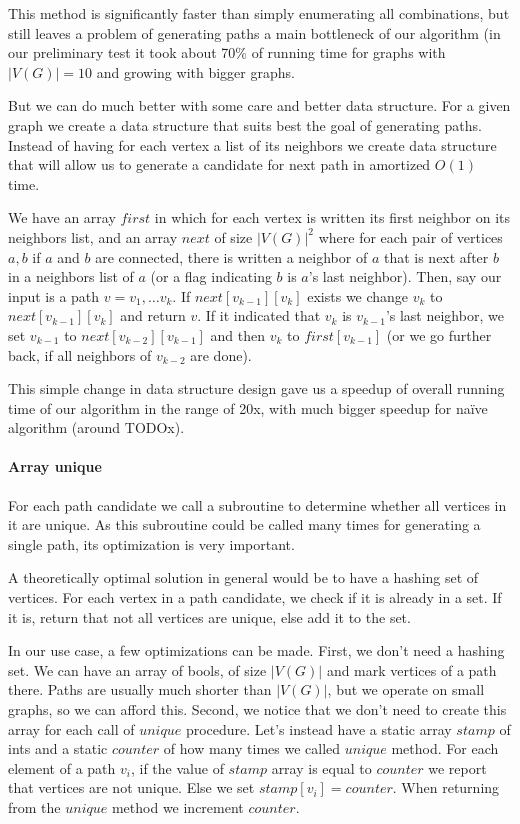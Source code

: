 This method is significantly faster than simply enumerating all combinations, but still leaves a problem of generating paths a main bottleneck of our algorithm (in our preliminary test it took about 70\% of running time for graphs with $|V(G)| = 10$ and growing with bigger graphs. 

But we can do much better with some care and better data structure. For a given graph we create a data structure that suits best the goal of generating paths. Instead of having for each vertex a list of its neighbors we create data structure that will allow us to generate a candidate for next path in amortized $O(1)$ time.

We have an array $first$ in which for each vertex is written its first neighbor on its neighbors list, and an array $next$ of size $|V(G)|^2$ where for each pair of vertices $a, b$ if $a$ and $b$ are connected, there is written a neighbor of $a$ that is next after $b$ in a neighbors list of $a$ (or a flag indicating $b$ is $a$'s last neighbor). Then, say our input is a path $v = v_1, \ldots v_k$. If $next[v_{k-1}][v_k]$ exists we change $v_k$ to $next[v_{k-1}][v_k]$ and return $v$. If it indicated that $v_k$ is $v_{k-1}$'s last neighbor, we set $v_{k-1}$ to $next[v_{k-2}][v_{k-1}]$ and then $v_k$ to $first[v_{k-1}]$ (or we go further back, if all neighbors of $v_{k-2}$ are done).

This simple change in data structure design gave us a speedup of overall running time of our algorithm in the range of 20x, with much bigger speedup for na\"ive algorithm (around TODOx).

\paragraph{Array unique}

For each path candidate we call a subroutine to determine whether all vertices in it are unique. As this subroutine could be called many times for generating a single path, its optimization is very important.

A theoretically optimal solution in general would be to have a hashing set of vertices. For each vertex in a path candidate, we check if it is already in a set. If it is, return that not all vertices are unique, else add it to the set.

In our use case, a few optimizations can be made. First, we don't need a hashing set. We can have an array of bools, of size $|V(G)|$ and mark vertices of a path there. Paths are usually much shorter than $|V(G)|$, but we operate on small graphs, so we can afford this. Second, we notice that we don't need to create this array for each call of $unique$ procedure. Let's instead have a static array $stamp$ of ints and a static $counter$ of how many times we called $unique$ method. For each element of a path $v_i$, if the value of $stamp$ array is equal to $counter$ we report that vertices are not unique. Else we set $stamp[v_i] = counter$. When returning from the $unique$ method we increment $counter$.

